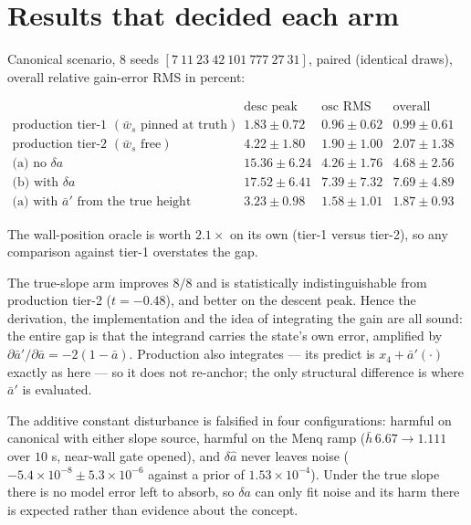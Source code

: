 \documentclass[11pt,a4paper,fontset=none]{ctexart}
\newcommand{\ba}{\bar{a}}
\newcommand{\bw}{\bar{w}}
\begin{document}
\section*{Results that decided each arm}

Canonical scenario, 8 seeds $[7\ 11\ 23\ 42\ 101\ 777\ 27\ 31]$, paired
(identical draws), overall relative gain-error RMS in percent:

\begin{equation*}
\begin{array}{lccc}
 & \text{desc peak} & \text{osc RMS} & \text{overall RMS} \\[0.2em]
\text{production tier-1 } (\bw_s \text{ pinned at truth}) & 1.83\pm0.72 & 0.96\pm0.62 & 0.99\pm0.61 \\
\text{production tier-2 } (\bw_s \text{ free}) & 4.22\pm1.80 & 1.90\pm1.00 & 2.07\pm1.38 \\
\text{(a) no } \delta a & 15.36\pm6.24 & 4.26\pm1.76 & 4.68\pm2.56 \\
\text{(b) with } \delta a & 17.52\pm6.41 & 7.39\pm7.32 & 7.69\pm4.89 \\
\text{(a) with } \ba' \text{ from the true height} & 3.23\pm0.98 & 1.58\pm1.01 & 1.87\pm0.93
\end{array}
\end{equation*}

The wall-position oracle is worth $2.1\times$ on its own (tier-1 versus
tier-2), so any comparison against tier-1 overstates the gap.

The true-slope arm improves $8/8$ and is statistically indistinguishable from
production tier-2 ($t = -0.48$), and better on the descent peak. Hence the
derivation, the implementation and the idea of integrating the gain are all
sound: the entire gap is that the integrand carries the state's own error,
amplified by $\partial\ba'/\partial\ba = -2(1-\ba)$. Production also
integrates --- its predict is $x_4 + \ba'(\cdot)$ exactly as here --- so it does
not re-anchor; the only structural difference is where $\ba'$ is evaluated.

The additive constant disturbance is falsified in four configurations: harmful
on canonical with either slope source, harmful on the Menq ramp
($\bar{h}\,6.67 \to 1.111$ over $10$ s, near-wall gate opened), and $\delta\hat{a}$
never leaves noise ($-5.4\times10^{-8} \pm 5.3\times10^{-6}$ against a prior of
$1.53\times10^{-4}$). Under the true slope there is no model error left to
absorb, so $\delta a$ can only fit noise and its harm there is expected rather
than evidence about the concept.
\end{document}

